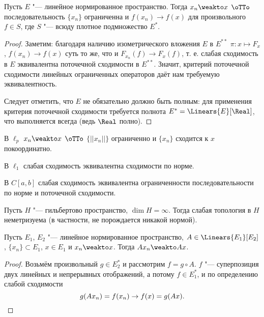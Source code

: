 \documentclass[main]{subfiles}
\begin{document}
\begin{theorem}
  Пусть \( E \) "--- линейное нормированное пространство.
  Тогда \( x_n \weakto x \) \( \oTTo \)
  последовательность \( \{ x_n \} \) ограниченна
  и \( f(x_n) \to f(x) \) для произвольного \( f \in S \),
  где \( S \) "--- всюду плотное подмножество \( E^* \).
\end{theorem}
\begin{proof}
  Заметим: благодаря наличию изометрического вложения
  \( E \) в \( E^{**} \) \( \pi : x \mapsto F_x \),
  \( f(x_n) \to f(x) \) суть то же, что и
  \( F_{x_n}(f) \to F_x(f) \),
  т. е. слабая сходимость
  в $E$ эквивалентна поточечной сходимости в $E^{**}$.
  Значит, критерий поточечной сходимости линейных
  ограниченных операторов даёт нам требуемую эквивалентность.

  Следует отметить, что \( E \) не обязательно должно быть
  полным: для применения критерия поточечной сходимости
  требуется полнота \( E^* = \Linears{E}[\Real] \),
  что выполняется всегда (ведь \( \Real \) полно).
\end{proof}

\begin{example}
  В  \( \ell_p \) \( x_n \weakto x \) \( \oTTo \)
  \( \{ ||x_n|| \} \) ограниченно и
  \( \{ x_n \} \) сходится к \( x \) покоординатно.
\end{example}

\begin{exercise}
  В \( \ell_1 \) слабая сходимость эквивалентна
  сходимости по норме.
\end{exercise}

\begin{example}
  В \( C[a, b] \) слабая сходимость эквивалентна
  ограниченности последовательности по норме
  и поточечной сходимости.
\end{example}

\begin{theorem*}
  Пусть \( H \) "--- гильбертово пространство,
  \( \dim H = \infty \).
  Тогда слабая топология в \( H \)
  неметризуема (в частности, не порождается никакой нормой).
\end{theorem*}

\begin{theorem}
  Пусть $E_1$, $E_2$ "--- линейное нормированное пространство,
  $A \in \Linears{E_1}[E_2]$, 
  \( \{ x_n \} \subset E_1 \), \( x \in E_1 \)
  и $x_n \weakto x$.
  Тогда $A x_n \weakto Ax$.
\end{theorem}
\begin{proof}
  Возьмём произвольный $g \in E_2^*$ и рассмотрим $f = g \circ A$.
  $f$ "--- суперпозиция двух линейных и непрерывных отображений,
  а потому $f \in E_1^*$, и по определению слабой сходимости
  \[ g(A x_n) = f(x_n) \to f(x) = g(A x). \qedhere \]
\end{proof}
\end{document}
